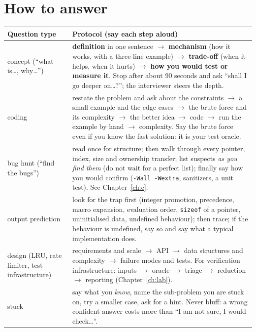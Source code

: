 \documentclass[10pt,a4paper,openany,oneside]{report}
\newcommand{\prio}[1]{\texorpdfstring{\ifcase#1\or{\color{gold}\ding{72}}\or{\color{gold}\ding{72}\ding{72}}\or{\color{gold}\ding{72}\ding{72}\ding{72}}\fi}{}}
\begin{document}
\section{How to answer \prio{3}}
\begin{center}\small
\begin{xltabular}{\textwidth}{@{}L{3.1cm}Y@{}}
\toprule
\textbf{Question type} & \textbf{Protocol (say each step aloud)}\\
\midrule\endhead
concept (``what is\ldots, why\ldots'') & \textbf{definition} in one sentence $\to$ \textbf{mechanism} (how it works, with a three-line example) $\to$ \textbf{trade-off} (when it helps, when it hurts) $\to$ \textbf{how you would test or measure it}. Stop after about 90 seconds and ask ``shall I go deeper on\ldots?''; the interviewer steers the depth.\\
coding & restate the problem and ask about the constraints $\to$ a small example and the edge cases $\to$ the brute force and its complexity $\to$ the better idea $\to$ code $\to$ run the example by hand $\to$ complexity. Say the brute force even if you know the fast solution: it is your test oracle.\\
bug hunt (``find the bugs'') & read once for structure; then walk through every pointer, index, size and ownership transfer; list suspects \emph{as you find them} (do not wait for a perfect list); finally say how you would confirm (\texttt{-Wall -Wextra}, sanitizers, a unit test). See Chapter~\ref{ch:c}.\\
output prediction & look for the trap first (integer promotion, precedence, macro expansion, evaluation order, \texttt{sizeof} of a pointer, uninitialised data, undefined behaviour); then trace; if the behaviour is undefined, say so and say what a typical implementation does.\\
design (LRU, rate limiter, test infrastructure) & requirements and scale $\to$ API $\to$ data structures and complexity $\to$ failure modes and tests. For verification infrastructure: inputs $\to$ oracle $\to$ triage $\to$ reduction $\to$ reporting (Chapter~\ref{ch:lab}).\\
stuck & say what you \emph{know}, name the sub-problem you are stuck on, try a smaller case, ask for a hint. Never bluff: a wrong confident answer costs more than ``I am not sure, I would check\ldots''.\\
\bottomrule
\end{xltabular}
\end{center}
\end{document}
